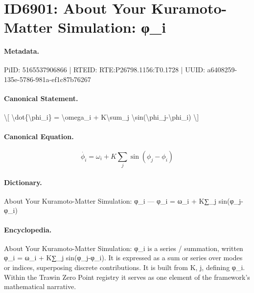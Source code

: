 \section*{ID6901: About Your Kuramoto-Matter Simulation: φ\_i}
\paragraph{Metadata.}
PiID: 5165537906866 | RTEID: RTE:P26798.1156:T0.1728 | UUID: a6408259-135e-5786-981a-ef1c87b76267

\paragraph{Canonical Statement.}
\textbackslash{}[ \textbackslash{}dot\{\textbackslash{}phi\_i\} = \textbackslash{}omega\_i + K\textbackslash{}sum\_j \textbackslash{}sin(\textbackslash{}phi\_j-\textbackslash{}phi\_i) \textbackslash{}]

\paragraph{Canonical Equation.}
\[
\dot{\phi_i} = \omega_i + K\sum_j \sin(\phi_j-\phi_i)
\]

\paragraph{Dictionary.}
About Your Kuramoto-Matter Simulation: φ\_i — φ\_i = ω\_i + K∑\_j sin(φ\_j-φ\_i)

\paragraph{Encyclopedia.}
About Your Kuramoto-Matter Simulation: φ\_i is a series / summation, written φ\_i = ω\_i + K∑\_j sin(φ\_j-φ\_i). It is expressed as a sum or series over modes or indices, superposing discrete contributions. It is built from K, j, defining φ\_i. Within the Trawin Zero Point registry it serves as one element of the framework's mathematical narrative.
